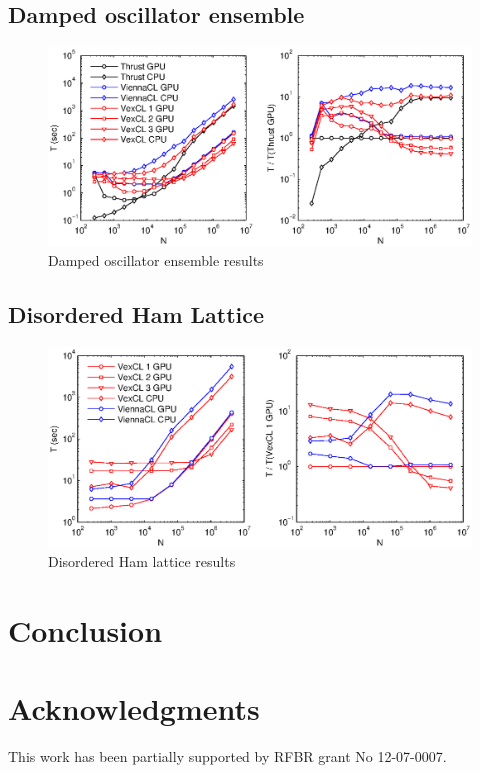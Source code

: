 \documentclass[1p]{elsarticle}
\begin{document}
\subsection{Damped oscillator ensemble}

\begin{figure}
    \begin{center}
	\includegraphics[width=\textwidth]{data/damped_oscillator/damped_oscillator}
    \end{center}
    \caption{Damped oscillator ensemble results}
    \label{fig:phase:perf}
\end{figure}

\subsection{Disordered Ham Lattice}

\begin{figure}
    \begin{center}
	\includegraphics[width=\textwidth]{data/disordered_lattice/disordered_lattice}
    \end{center}
    \caption{Disordered Ham lattice results}
    \label{fig:phase:perf}
\end{figure}

\section{Conclusion}

\section{Acknowledgments}

This work has been partially supported by RFBR grant No 12-07-0007.

\nocite{*}


\end{document}
